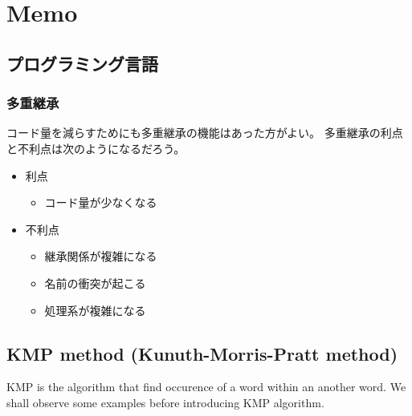 \section{Memo}\label{sec:memorandom}
\newcommand{\rmapr}{M_{\mybf{R}}\mybf{R}}
\newcommand{\nmapr}{M_{\mybf{R}}\mybf{N}}
\newcommand{\zmapr}{M_{\mybf{R}}\mybf{Z}}
\newcommand{\loner}{L\mybf{R}}
\newcommand{\intallr}[1]{\int_{{#1}\in\mybf{R}}}

\newcommand{\sgraph}{\entrymodifiers={++[o][F-]}\xymatrix@R=1pt@C-1pc}

\subsection{プログラミング言語}

\subsubsection{多重継承}
コード量を減らすためにも多重継承の機能はあった方がよい。
多重継承の利点と不利点は次のようになるだろう。
\begin{itemize}
\item 利点
	\begin{itemize}
	\item コード量が少なくなる
	\end{itemize}
\item 不利点
	\begin{itemize}
	\item 継承関係が複雑になる
	\item 名前の衝突が起こる
	\item 処理系が複雑になる
	\end{itemize}
\end{itemize}

\subsection{KMP method (Kunuth-Morris-Pratt method)}
KMP is the algorithm that find occurence of a word within an another word.
We shall observe some examples before introducing KMP algorithm.

